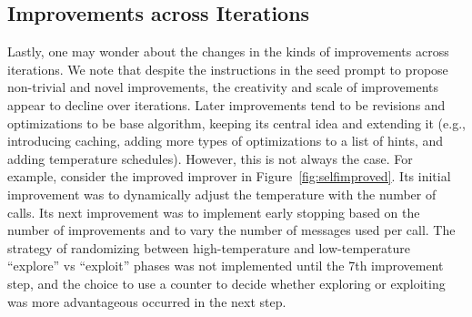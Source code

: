 \documentclass{article} %
\begin{document}
\clearpage
\newpage

\subsection{Improvements across Iterations}
Lastly, one may wonder about the changes in the kinds of improvements across iterations. We note that despite the instructions in the seed prompt to propose non-trivial and novel improvements, the creativity and scale of improvements appear to decline over iterations. Later improvements tend to be revisions and optimizations to be base algorithm, keeping its central idea and extending it (e.g., introducing caching, adding more types of optimizations to a list of hints, and adding temperature schedules). However, this is not always the case. For example, consider the improved improver in Figure~\ref{fig:selfimproved}. Its initial improvement was to dynamically adjust the temperature with the number of calls. Its next improvement was to implement early stopping based on the number of improvements and to vary the number of messages used per call. The strategy of randomizing between high-temperature and low-temperature ``explore'' vs ``exploit'' phases was not implemented until the 7th improvement step, and the choice to use a counter to decide whether exploring or exploiting was more advantageous occurred in the next step.

\clearpage
\newpage
\end{document}
